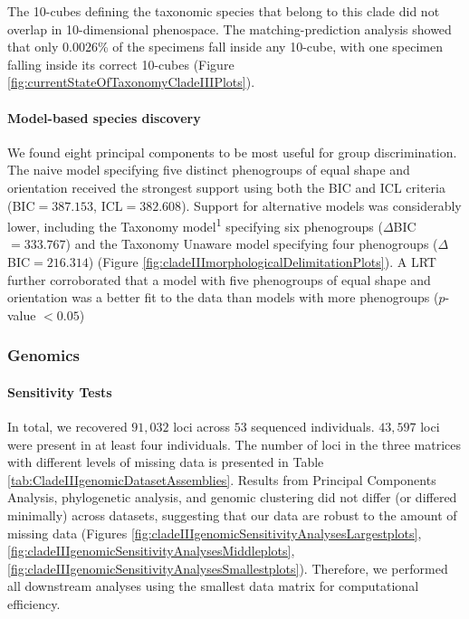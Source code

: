 \documentclass[
  11pt,
]{article}
\begin{document}
The 10-cubes defining the taxonomic species that belong to this clade did not overlap in 10-dimensional phenospace. The matching-prediction analysis showed that only \(0.0026\)\% of the specimens fall inside any 10-cube, with one specimen falling inside its correct 10-cubes (Figure \ref{fig:currentStateOfTaxonomyCladeIIIPlots}).

\hypertarget{model-based-species-discovery-4}{%
\paragraph{Model-based species discovery}\label{model-based-species-discovery-4}}

We found eight principal components to be most useful for group discrimination. The naive model specifying five distinct phenogroups of equal shape and orientation received the strongest support using both the BIC and ICL criteria (BIC\(=387.153\), ICL\(=382.608\)). Support for alternative models was considerably lower, including the Taxonomy model\textsuperscript{1} specifying six phenogroups (\(\Delta\)BIC\(=333.767\)) and the Taxonomy Unaware model specifying four phenogroups (\(\Delta\)BIC\(=216.314\)) (Figure \ref{fig:cladeIIImorphologicalDelimitationPlots}). A LRT further corroborated that a model with five phenogroups of equal shape and orientation was a better fit to the data than models with more phenogroups (\(p\)-value \(< 0.05\))

\hypertarget{genomics-3}{%
\subsubsection{Genomics}\label{genomics-3}}

\hypertarget{sensitivity-tests-2}{%
\paragraph{Sensitivity Tests}\label{sensitivity-tests-2}}

In total, we recovered \(91,032\) loci across \(53\) sequenced individuals. \(43,597\) loci were present in at least four individuals. The number of loci in the three matrices with different levels of missing data is presented in Table \ref{tab:CladeIIIgenomicDatasetAssemblies}. Results from Principal Components Analysis, phylogenetic analysis, and genomic clustering did not differ (or differed minimally) across datasets, suggesting that our data are robust to the amount of missing data (Figures \ref{fig:cladeIIIgenomicSensitivityAnalysesLargestplots}, \ref{fig:cladeIIIgenomicSensitivityAnalysesMiddleplots}, \ref{fig:cladeIIIgenomicSensitivityAnalysesSmallestplots}). Therefore, we performed all downstream analyses using the smallest data matrix for computational efficiency.
\end{document}
